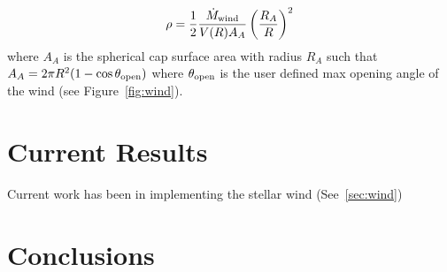 \documentclass[fleqn,usenatbib]{mnras}
\begin{document}
\begin{equation}
    \rho = \frac{1}{2}\frac{\dot{M}_{\rm wind}}{V(R)A_{A}}\left( \frac{R_{A}}{R}\right)^2
\end{equation}
where $A_A$ is the spherical cap surface area with radius $R_A$ such that $A_A = 2\pi R^2 (1-\cos\theta_{\rm open})$ where $\theta_{\rm open}$ is the user defined max opening angle of the wind (see Figure~\ref{fig:wind}).

\section{Current Results}
\label{sec:results}

Current work has been in implementing the stellar wind (See~\ref{sec:wind})
\section{Conclusions}
\label{sec:conclusions}













\bsp    %
\label{lastpage}
\end{document}
